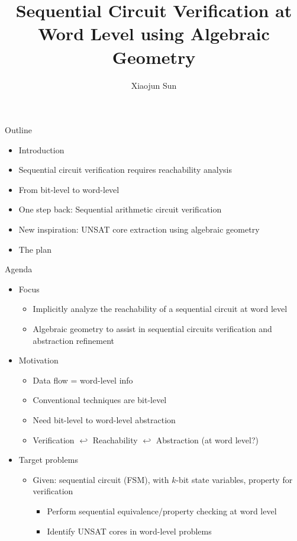 \documentclass[xcolor=dvipsnames]{beamer}
\title[Ph.D Proposal]{Sequential Circuit Verification at Word Level using Algebraic Geometry}
\author[Xiaojun Sun]{Xiaojun Sun}
\institute[Univ. of Utah]{
Ph.D Candidate\\
Electrical and Computer Engineering, University of Utah\\
xiaojuns@ece.utah.edu\\
\ \\
\ \\
{\bf Ph.D's Dissertation Proposal}\\
}
\date{}
\newcommand{\bi}{\begin{itemize}}
\newcommand{\ei}{\end{itemize}}
\begin{document}
\begin{frame}[plain]
  \titlepage

\end{frame}

\begin{frame}{\large{Outline}}
\bi
\item Introduction
\item Sequential circuit verification requires reachability analysis
\item From bit-level to word-level
\item One step back: Sequential arithmetic circuit verification
\item New inspiration: UNSAT core extraction using algebraic geometry
\item The plan
\ei
\end{frame}

\begin{frame}{\large{Agenda}}

\begin{itemize}
\item Focus
	\begin{itemize}
	\item Implicitly analyze the reachability of a sequential circuit at word level
	\item Algebraic geometry to assist in sequential circuits verification and abstraction refinement
	\end{itemize}
\item Motivation
	\begin{itemize}
	\item Data flow = word-level info
	\item Conventional techniques are bit-level
	\item Need bit-level to word-level abstraction
	\item Verification $\hookleftarrow$ Reachability $\hookleftarrow$ Abstraction (at word level?)
	\end{itemize}
\item Target problems 
	\begin{itemize}
	\item Given: sequential circuit (FSM), with $k$-bit state variables, property for verification
     \bi
		\item Perform sequential equivalence/property checking at word level
        \item Identify UNSAT cores in word-level problems
     \ei
	\end{itemize}
	\end{itemize}
\end{frame}
\end{document}
